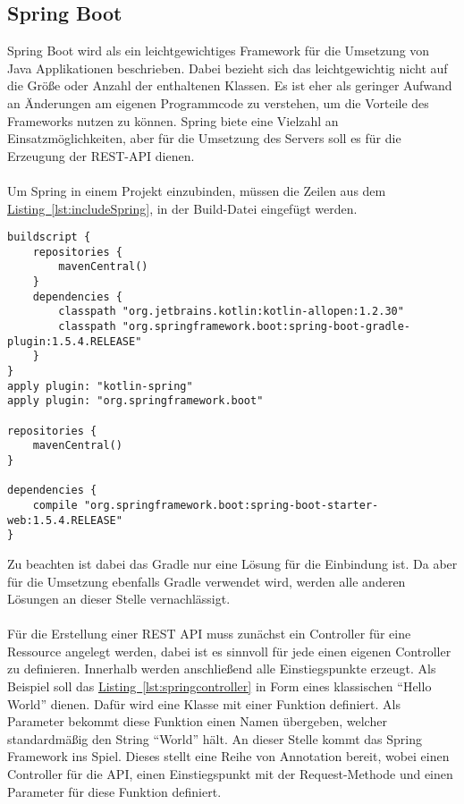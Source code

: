 \subsection{Spring Boot}\label{sec:bibspring}
Spring Boot wird als ein leichtgewichtiges Framework für die Umsetzung von Java Applikationen beschrieben. Dabei bezieht sich das leichtgewichtig nicht auf die Größe oder Anzahl der enthaltenen Klassen. Es ist eher als geringer Aufwand an Änderungen am eigenen Programmcode zu verstehen, um die Vorteile des Frameworks nutzen zu können. \cite{proSpring5} Spring biete eine Vielzahl an Einsatzmöglichkeiten, aber für die Umsetzung des Servers soll es für die Erzeugung der \gls{REST}-\gls{API} dienen.\\
\\
Um Spring in einem Projekt einzubinden, müssen die Zeilen aus dem \hyperref[lst:includeSpring]{Listing~\ref{lst:includeSpring}}, in der Build-Datei  eingefügt werden.
\begin{lstlisting}[style=lstStyleFramed, language=Gradle, caption={Einbindung des Spring Framework mithilfe von Gradle}, label=lst:includeSpring, float]
buildscript {
	repositories {
		mavenCentral()
	}
	dependencies {
		classpath "org.jetbrains.kotlin:kotlin-allopen:1.2.30"
		classpath "org.springframework.boot:spring-boot-gradle-plugin:1.5.4.RELEASE"
	}
}
apply plugin: "kotlin-spring"
apply plugin: "org.springframework.boot"

repositories {
	mavenCentral()
}

dependencies {
	compile "org.springframework.boot:spring-boot-starter-web:1.5.4.RELEASE"
}
\end{lstlisting}
Zu beachten ist dabei das Gradle nur eine Lösung für die Einbindung ist. Da aber für die Umsetzung ebenfalls Gradle verwendet wird, werden alle anderen Lösungen an dieser Stelle vernachlässigt.\\
\\ 
Für die Erstellung einer \gls{REST} \gls{API} muss zunächst ein Controller für eine Ressource angelegt werden, dabei ist es sinnvoll für jede einen eigenen Controller zu definieren. Innerhalb werden anschließend alle Einstiegspunkte erzeugt. Als Beispiel soll das \hyperref[lst:springcontroller]{Listing~\ref{lst:springcontroller}} in Form eines klassischen \enquote{Hello World} dienen. Dafür wird eine Klasse  mit einer Funktion  definiert. Als Parameter bekommt diese Funktion einen Namen übergeben, welcher standardmäßig den String \enquote{World} hält. An dieser Stelle kommt das Spring Framework ins Spiel. Dieses stellt eine Reihe von Annotation bereit, wobei  einen Controller für die \gls{API},  einen Einstiegspunkt mit der Request-Methode  und  einen Parameter für diese Funktion definiert. 

